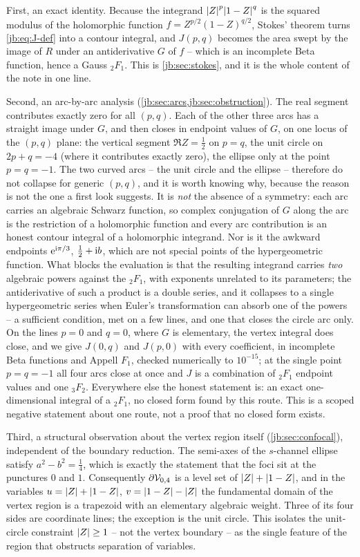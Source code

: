 First, an exact identity.
Because the integrand ${|Z|}^p {|1 - Z|}^q$ is the squared modulus of the holomorphic function
$f = Z^{p/2} (1 - Z)^{q/2}$, Stokes' theorem turns \eqref{jb:eq:J-def} into a contour integral, and
$J(p, q)$ becomes the area swept by the image of $R$ under an antiderivative $G$ of $f$ -- which is
an incomplete Beta function, hence a Gauss ${}_2F_1$.
This is \cref{jb:sec:stokes}, and it is the whole content of the note in one line.

Second, an arc-by-arc analysis (\cref{jb:sec:arcs,jb:sec:obstruction}).
The real segment contributes exactly zero for all $(p, q)$.
Each of the other three arcs has a straight image under $G$, and then closes in endpoint values of
$G$, on one locus of the $(p, q)$ plane: the vertical segment $\Re Z = \tfrac12$ on $p = q$, the
unit circle on $2p + q = -4$ (where it contributes exactly zero), the ellipse only at the point
$p = q = -1$.
The two curved arcs -- the unit circle and the ellipse -- therefore do not collapse for generic
$(p, q)$, and it is worth knowing why, because the reason is not the one a first look suggests.
It is \emph{not} the absence of a symmetry: each arc carries an algebraic Schwarz function, so
complex conjugation of $G$ along the arc is the restriction of a holomorphic function and every arc
contribution is an honest contour integral of a holomorphic integrand.
Nor is it the awkward endpoints $\mathrm{e}^{\mathrm{i} \pi/3}$, $\tfrac12 + \mathrm{i} b$, which are not special points of
the hypergeometric function.
What blocks the evaluation is that the resulting integrand carries \emph{two} algebraic powers
against the ${}_2F_1$, with exponents unrelated to its parameters; the antiderivative of such a
product is a double series, and it collapses to a single hypergeometric series when Euler's
transformation can absorb one of the powers -- a sufficient condition, met on a few lines, and one
that closes the circle arc only.
On the lines $p = 0$ and $q = 0$, where $G$ is elementary, the vertex integral does close, and we
give $J(0, q)$ and $J(p, 0)$ with every coefficient, in incomplete Beta functions and Appell $F_1$,
checked numerically to $10^{-15}$; at the single point $p = q = -1$ all four arcs close at once and
$J$ is a combination of ${}_2F_1$ endpoint values and one ${}_3F_2$.
Everywhere else the honest statement is: an exact one-dimensional integral of a ${}_2F_1$, no
closed form found by this route.
This is a scoped negative statement about one route, not a proof that no closed form exists.

Third, a structural observation about the vertex region itself (\cref{jb:sec:confocal}), independent of
the boundary reduction.
The semi-axes of the $s$-channel ellipse satisfy $a^2 - b^2 = \tfrac14$, which is exactly the
statement that the foci sit at the punctures $0$ and $1$.
Consequently $\partial {\mathcal{V}}_{0,4}$ is a level set of ${|Z|} + {|1 - Z|}$, and in the variables
$u = {|Z|} + {|1 - Z|}$, $v = {|1 - Z|} - {|Z|}$ the fundamental domain of the vertex region
is a trapezoid with an elementary algebraic weight.
Three of its four sides are coordinate lines; the exception is the unit circle.
This isolates the unit-circle constraint ${|Z|} \ge 1$ -- not the vertex boundary -- as the
single feature of the region that obstructs separation of variables.

